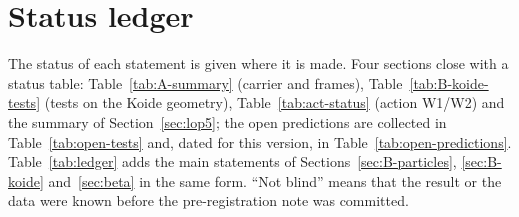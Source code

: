 \section{Status ledger}
\label{sec:ledger}

The status of each statement is given where it is made. Four sections close with a status table:
Table~\ref{tab:A-summary} (carrier and frames), Table~\ref{tab:B-koide-tests} (tests on the Koide geometry),
Table~\ref{tab:act-status} (action W1/W2) and the summary of Section~\ref{sec:lop5}; the open predictions are collected in
Table~\ref{tab:open-tests} and, dated for this version, in Table~\ref{tab:open-predictions}. Table~\ref{tab:ledger} adds the main statements of Sections~\ref{sec:B-particles},
\ref{sec:B-koide} and~\ref{sec:beta} in the same form. ``Not blind'' means that the result or the data were known before the
pre-registration note was committed.

